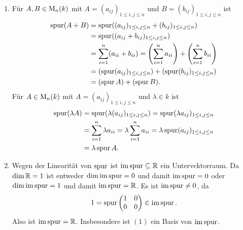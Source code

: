 \begin{solution}
 \begin{enumerate}
  \item
   Für $A, B \in \operatorname{M}_n(k)$ mit $A = (a_{ij})_{1 \leq i,j \leq n}$ und $B = (b_{ij})_{1 \leq i,j \leq n}$ ist
   \begin{align*}
    \operatorname{spur}(A+B)
    &= \operatorname{spur}( (a_{ij})_{1 \leq i,j \leq n} + (b_{ij})_{1 \leq i,j \leq n} ) \\
    &= \operatorname{spur}( (a_{ij}+b_{ij})_{1 \leq i,j \leq n} ) \\
    &= \sum_{i=1}^n (a_{ii} + b_{ii})
    = \left(\sum_{i=1}^n a_{ii}\right) + \left(\sum_{i=1}^n b_{ii}\right) \\
    &= (\operatorname{spur} (a_{ij})_{1 \leq i,j \leq n}) + (\operatorname{spur} (b_{ij})_{1 \leq i,j \leq n}) \\
    &= (\operatorname{spur} A) + (\operatorname{spur} B).
   \end{align*}
   Für $A \in \operatorname{M}_n(k)$ mit $A = (a_{ij})_{1 \leq i,j \leq n}$ und $\lambda \in k$ ist
   \begin{align*}
    \operatorname{spur}(\lambda A)
    &= \operatorname{spur}(\lambda (a_{ij})_{1 \leq i,j \leq n})
    = \operatorname{spur} (\lambda a_{ij})_{1 \leq i,j \leq n} \\
    &= \sum_{i=1}^n \lambda a_{ii}
    = \lambda \sum_{i=1}^n a_{ii}
    = \lambda \operatorname{spur} (a_{ij})_{1 \leq i,j \leq n} \\
    &= \lambda \operatorname{spur} A.
   \end{align*}
  \item
   Wegen der Linearität von $\operatorname{spur}$ ist $\operatorname{im} \operatorname{spur} \subseteq \mathbb{R}$ ein Untervektorraum. Da $\dim \mathbb{R} = 1$ ist entweder $\dim \operatorname{im} \operatorname{spur} = 0$ und damit $\operatorname{im} \operatorname{spur} = 0$ oder $\dim \operatorname{im} \operatorname{spur} = 1$ und damit $\operatorname{im} \operatorname{spur} = \mathbb{R}$. Es ist $\operatorname{im} \operatorname{spur} \neq 0$, da
   \[
    1 = \operatorname{spur} \begin{pmatrix} 1 & 0 \\ 0 & 0 \end{pmatrix} \in \operatorname{im} \operatorname{spur}.
   \]
   Also ist $\operatorname{im} \operatorname{spur} = \mathbb{R}$. Insbesondere ist $(1)$ ein Basis von $\operatorname{im} \operatorname{spur}$.
   

\end{enumerate}
\end{solution}
